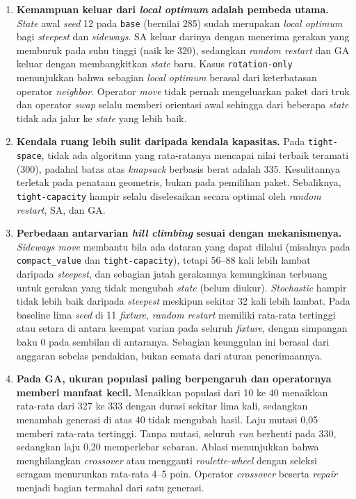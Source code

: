 \begin{enumerate}
    \item \textbf{Kemampuan keluar dari \textit{local optimum} adalah pembeda utama.} \textit{State} awal \textit{seed} 12 pada \texttt{base} (bernilai 285) sudah merupakan \textit{local optimum} bagi \textit{steepest} dan \textit{sideways}. SA keluar darinya dengan menerima gerakan yang memburuk pada suhu tinggi (naik ke 320), sedangkan \textit{random restart} dan GA keluar dengan membangkitkan \textit{state} baru. Kasus \texttt{rotation-only} menunjukkan bahwa sebagian \textit{local optimum} berasal dari keterbatasan operator \textit{neighbor}. Operator \textit{move} tidak pernah mengeluarkan paket dari truk dan operator \textit{swap} selalu memberi orientasi awal sehingga dari beberapa \textit{state} tidak ada jalur ke \textit{state} yang lebih baik.

    \item \textbf{Kendala ruang lebih sulit daripada kendala kapasitas.} Pada \texttt{tight-space}, tidak ada algoritma yang rata-ratanya mencapai nilai terbaik teramati (300), padahal batas atas \textit{knapsack} berbasis berat adalah 335. Kesulitannya terletak pada penataan geometris, bukan pada pemilihan paket. Sebaliknya, \texttt{tight-capacity} hampir selalu diselesaikan secara optimal oleh \textit{random restart}, SA, dan GA.

    \item \textbf{Perbedaan antarvarian \textit{hill climbing} sesuai dengan mekanismenya.} \textit{Sideways move} membantu bila ada dataran yang dapat dilalui (misalnya pada \texttt{compact\_value} dan \texttt{tight-capacity}), tetapi 56--88 kali lebih lambat daripada \textit{steepest}, dan sebagian jatah gerakannya kemungkinan terbuang untuk gerakan yang tidak mengubah \textit{state} (belum diukur). \textit{Stochastic} hampir tidak lebih baik daripada \textit{steepest} meskipun sekitar 32 kali lebih lambat. Pada baseline lima \textit{seed} di 11 \textit{fixture}, \textit{random restart} memiliki rata-rata tertinggi atau setara di antara keempat varian pada seluruh \textit{fixture}, dengan simpangan baku 0 pada sembilan di antaranya. Sebagian keunggulan ini berasal dari anggaran sebelas pendakian, bukan semata dari aturan penerimaannya.

    \item \textbf{Pada GA, ukuran populasi paling berpengaruh dan operatornya memberi manfaat kecil.} Menaikkan populasi dari 10 ke 40 menaikkan rata-rata dari 327 ke 333 dengan durasi sekitar lima kali, sedangkan menambah generasi di atas 40 tidak mengubah hasil. Laju mutasi 0,05 memberi rata-rata tertinggi. Tanpa mutasi, seluruh \textit{run} berhenti pada 330, sedangkan laju 0,20 memperlebar sebaran. Ablasi menunjukkan bahwa menghilangkan \textit{crossover} atau mengganti \textit{roulette-wheel} dengan seleksi seragam menurunkan rata-rata 4--5 poin. Operator \textit{crossover} beserta \textit{repair} menjadi bagian termahal dari satu generasi.


\end{enumerate}
